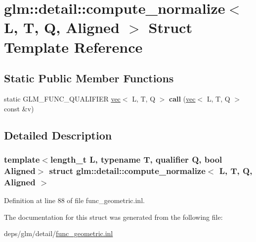 \hypertarget{structglm_1_1detail_1_1compute__normalize}{}\section{glm\+:\+:detail\+:\+:compute\+\_\+normalize$<$ L, T, Q, Aligned $>$ Struct Template Reference}
\label{structglm_1_1detail_1_1compute__normalize}
\subsection*{Static Public Member Functions}
\begin{DoxyCompactItemize}
\item 
\mbox{\label{structglm_1_1detail_1_1compute__normalize_aa29b26ddafc5ea1e2c7798c0caf22ed2}} 
static G\+L\+M\+\_\+\+F\+U\+N\+C\+\_\+\+Q\+U\+A\+L\+I\+F\+I\+ER \hyperlink{structglm_1_1vec}{vec}$<$ L, T, Q $>$ {\bfseries call} (\hyperlink{structglm_1_1vec}{vec}$<$ L, T, Q $>$ const \&v)
\end{DoxyCompactItemize}


\subsection{Detailed Description}
\subsubsection*{template$<$length\+\_\+t L, typename T, qualifier Q, bool Aligned$>$\newline
struct glm\+::detail\+::compute\+\_\+normalize$<$ L, T, Q, Aligned $>$}



Definition at line 88 of file func\+\_\+geometric.\+inl.



The documentation for this struct was generated from the following file\+:\begin{DoxyCompactItemize}
\item 
deps/glm/detail/\hyperlink{func__geometric_8inl}{func\+\_\+geometric.\+inl}\end{DoxyCompactItemize}
